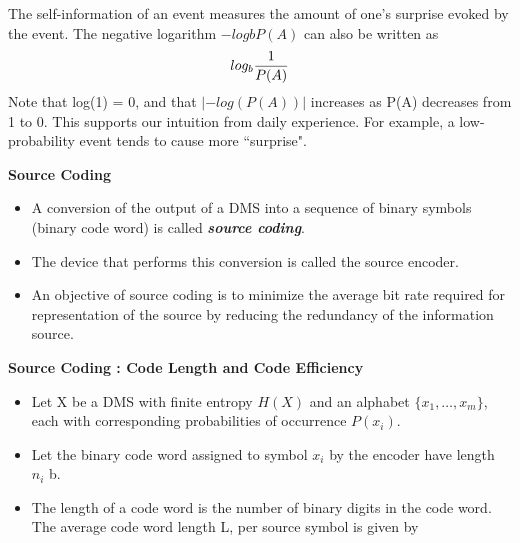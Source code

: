 {\begin{frame}
The self-information of an event measures the amount of one's surprise
evoked by the event. The negative logarithm $−logb P(A)$ can also be written as \[
log_b  {1 \over P(A)} \]
Note that log(1) = 0, and that $| − log(P(A))|$ increases as P(A) decreases
from 1 to 0. This supports our intuition from daily experience. For example,
a low-probability event tends to cause more ``surprise".
\end{frame}











\noindent \textbf{Source Coding}
\begin{itemize}
\item A conversion of the output of a DMS into a sequence of binary symbols (binary code word) is
called \textbf{\emph{source coding}}.
\item  The device that performs this conversion is called the source encoder.
\item
An objective of source coding is to minimize the average bit rate required for representation of the
source by reducing the redundancy of the information source.
\end{itemize}



\noindent \textbf{Source Coding : Code Length and Code Efficiency}
\begin{itemize}

\item
Let X be a DMS with finite entropy $H(X)$ and an alphabet $\{x_1 , \ldots,  x_m\}$, each with corresponding
probabilities of occurrence $P(x_i)$. \item Let the binary code word assigned to symbol $x_i$ by
the encoder have length $n_i$ b. \item The length of a code word is the number of binary digits
in the code word. The average code word length L, per source symbol is given by


\end{itemize}}
